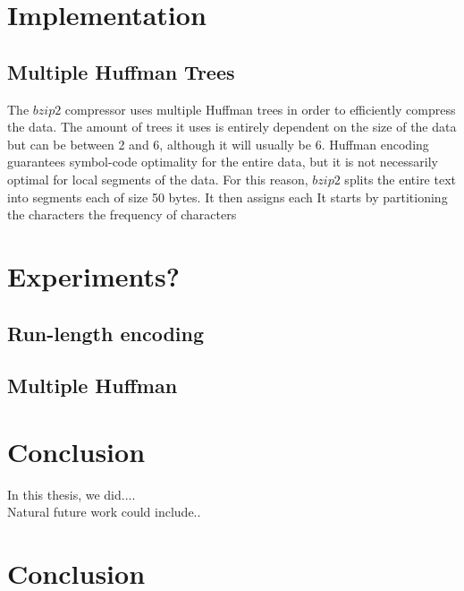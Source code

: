 \documentclass{article}
\begin{document}
\section{Implementation}

\subsection{Multiple Huffman Trees}
The \(bzip2\) compressor uses multiple Huffman trees in order to efficiently compress the data. The amount of trees it uses is entirely dependent on the size of the data but can be between 2 and 6, although it will usually be 6.
Huffman encoding guarantees symbol-code optimality for the entire data, but it is not necessarily optimal for local segments of the data. For this reason, \(bzip2\) splits the entire text into segments each of size 50 bytes. It then assigns each 
It starts by partitioning the characters the frequency of characters 

\section{Experiments?}
\subsection{Run-length encoding}

\subsection{Multiple Huffman}

\section{Conclusion}
In this thesis, we did.... \\
Natural future work could include..
\section{Conclusion}


\printbibliography %
\end{document}

